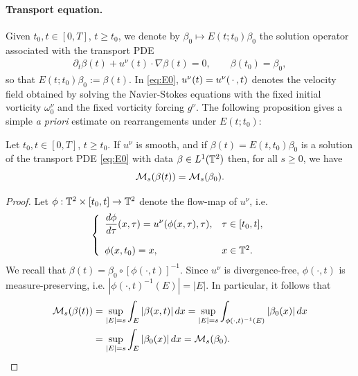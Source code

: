 \documentclass[reqno,12pt]{amsart}
\begin{document}
\paragraph*{\textbf{Transport equation.}}
Given $t_0, t \in [0,T]$, $t\ge t_0$, we denote by $\beta_0 \mapsto E(t;t_0) \beta_0$ the solution operator associated with the transport PDE
\begin{align}
\label{eq:E0}
\partial_t \beta(t) + u^\nu(t) \cdot \nabla \beta(t) = 0,
\qquad
\beta(t_0) = \beta_0,
\tag{E}
\end{align}
so that $E(t;t_0)\beta_0 := \beta(t)$. In \eqref{eq:E0}, $u^\nu(t) = u^\nu({\,\cdot\,},t)$ denotes the velocity field obtained by solving the Navier-Stokes equations with the fixed initial vorticity $\omega^\nu_0$ and the fixed vorticity forcing $g^\nu$. The following proposition gives a simple {\it a priori} estimate on rearrangements under $E(t;t_0)$:

\begin{proposition}
\label{prop:Erearrange}
Let $t_0,t\in [0,T]$, $t\ge t_0$. If $u^\nu$ is smooth, and if $\beta (t) = E(t,t_0)\beta_0$ is a solution of the transport PDE \eqref{eq:E0} with data $\beta \in L^{1}(\mathbb{T}^2)$  then, for all $s \ge 0$, we have
\[
\mathcal{M}_s(\beta(t))
=
\mathcal{M}_s(\beta_0).
\]
\end{proposition}

\begin{proof}
Let $\phi : \mathbb{T}^2 \times [t_0,t] \to \mathbb{T}^2$ denote the  flow-map of $u^\nu$, i.e.
\[
\left\{
\begin{array}{ll}
\displaystyle{\frac{d\phi}{d\tau}} (x,\tau)  = u^\nu(\phi (x,\tau),\tau), & \tau \in [t_0,t], \\ & \\
\phi(x,t_0)  = x, & x \in \mathbb{T}^2.
\end{array}
\right.
\]
We recall that $\beta(t) = \beta_0\circ [\phi(\cdot,t)]^{-1}$. Since $u^\nu$ is divergence-free, $\phi(\cdot,t)$ is measure-preserving, i.e. $|\phi(\cdot,t)^{-1}(E)|=|E|$. In particular, it follows that
\begin{align*}
\mathcal{M}_s(\beta(t))
&=
\sup_{|E|=s} \int_E |\beta(x,t)| \, dx
=
\sup_{|E|=s} \int_{\phi (\cdot, t)^{-1}(E)} |\beta_0(x)| \, dx
\\
&=
\sup_{|E|=s} \int_E |\beta_0(x)| \, dx
=
\mathcal{M}_s(\beta_0).
\end{align*}
\end{proof}

\bigskip
\end{document}
